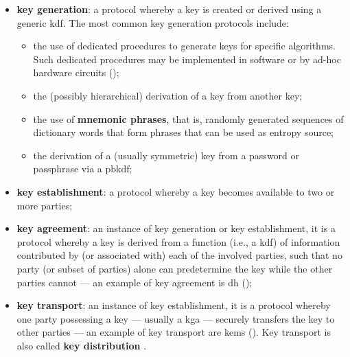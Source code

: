 \begin{itemize}
	\item \textbf{key generation}: a protocol whereby a key is created or derived using a generic \gls{kdf}. The most common key generation protocols include:
	\begin{itemize}
		\item the use of dedicated procedures to generate keys for specific algorithms. Such dedicated procedures may be implemented in software or by ad-hoc hardware circuits ();
		\item the (possibly hierarchical) derivation of a key from another key;
		\item the use of \textbf{mnemonic phrases}, that is, randomly generated sequences of dictionary words that form phrases that can be used as entropy source;
		\item the derivation of a (usually symmetric) key from a password or passphrase via a \gls{pbkdf};
	\end{itemize}
	\item \textbf{key establishment}: a protocol whereby a key becomes available to two or more parties;
	\item \textbf{key agreement}: an instance of key generation or key establishment, it is a protocol whereby a key is derived from a function (i.e., a \gls{kdf}) of information contributed by (or associated with) each of the involved parties, such that no party (or subset of parties) alone can predetermine the key while the other parties cannot --- an example of key agreement is \gls{dh} ();
	\item \textbf{key transport}: an instance of key establishment, it is a protocol whereby one party possessing a key --- usually a \gls{kga} --- securely transfers the key to other parties --- an example of key transport are \glspl{kem} (). Key transport is also called \textbf{key distribution} \cite{barker_recommendation_2020_p1}.
\end{itemize}


